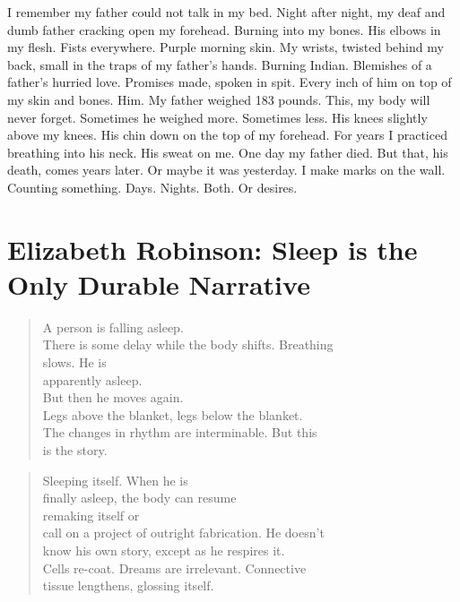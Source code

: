 \documentclass[
]{memoir}
\begin{document}
I remember my father could not talk in my bed. Night after night, my
deaf and dumb father cracking open my forehead. Burning into my bones.
His elbows in my flesh. Fists everywhere. Purple morning skin. My
wrists, twisted behind my back, small in the traps of my father's hands.
Burning Indian. Blemishes of a father's hurried love. Promises made,
spoken in spit. Every inch of him on top of my skin and bones. Him. My
father weighed 183 pounds. This, my body will never forget. Sometimes he
weighed more. Sometimes less. His knees slightly above my knees. His
chin down on the top of my forehead. For years I practiced breathing
into his neck. His sweat on me. One day my father died. But that, his
death, comes years later. Or maybe it was yesterday. I make marks on the
wall. Counting something. Days. Nights. Both. Or desires.

\hypertarget{elizabeth-robinson-sleep-is-the-only-durable-narrative}{%
\chapter{Elizabeth Robinson: Sleep is the Only Durable
Narrative}\label{elizabeth-robinson-sleep-is-the-only-durable-narrative}}

\begin{verse}
A person is falling asleep.\\
There is some delay while the body shifts. Breathing\\
slows. He is\\
apparently asleep.\\
But then he moves again.\\
Legs above the blanket, legs below the blanket.\\
The changes in rhythm are interminable. But this\\
is the story.\\
\end{verse}

\begin{verse}
Sleeping itself. When he is\\
finally asleep, the body can resume\\
remaking itself or\\
call on a project of outright fabrication. He doesn’t\\
know his own story, except as he respires it.\\
Cells re-coat. Dreams are irrelevant. Connective\\
tissue lengthens, glossing itself.\\
\end{verse}
\end{document}
